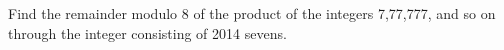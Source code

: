 Find the remainder modulo 8 of the product of the integers 7,77,777, and so on through the integer consisting of 2014 sevens.
